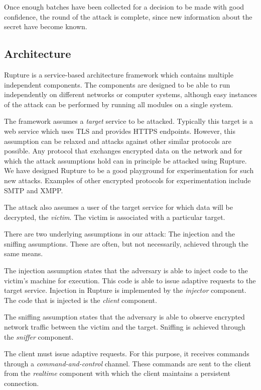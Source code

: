 Once enough batches have been collected for a decision to be made with good
confidence, the round of the attack is complete, since new information about the
secret have become known.

\subsection{Architecture}\label{app:rupture}
Rupture is a service-based architecture framework which contains multiple
independent components. The components are designed to be able to run
independently on different networks or computer systems, although easy instances
of the attack can be performed by running all modules on a single system.

The framework assumes a \textit{target} service to be attacked. Typically this
target is a web service which uses TLS and provides HTTPS endpoints. However,
this assumption can be relaxed and attacks against other similar protocols are
possible. Any protocol that exchanges encrypted data on the network and for
which the attack assumptions hold can in principle be attacked using Rupture. We
have designed Rupture to be a good playground for experimentation for such new
attacks. Examples of other encrypted protocols for experimentation include SMTP
and XMPP.

The attack also assumes a user of the target service for which data will be
decrypted, the \textit{victim}. The victim is associated with a particular
target.

There are two underlying assumptions in our attack: The injection and the
sniffing assumptions. These are often, but not necessarily, achieved through the
same means.

The injection assumption states that the adversary is able to inject code to the
victim's machine for execution. This code is able to issue adaptive requests to
the target service. Injection in Rupture is implemented by the \textit{injector}
component. The code that is injected is the \textit{client} component.

The sniffing assumption states that the adversary is able to observe encrypted
network traffic between the victim and the target. Sniffing is achieved through
the \textit{sniffer} component.

The client must issue adaptive requests. For this purpose, it receives commands
through a \textit{command-and-control} channel. These commands are sent to the
client from the \textit{realtime} component with which the client maintains a
persistent connection.

